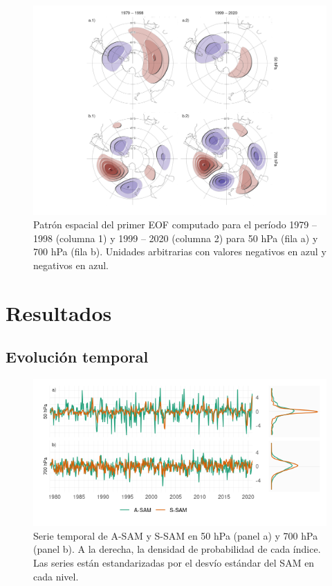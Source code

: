 \documentclass[12pt,oneside]{reedthesis}
\begin{document}
\begin{figure}
\includegraphics{figures/30-sam/sam-period-1} \caption{Patrón espacial del primer EOF computado para el período 1979 -- 1998 (columna 1) y 1999 -- 2020 (columna 2) para 50 hPa (fila a) y 700 hPa (fila b). Unidades arbitrarias con valores negativos en azul y negativos en azul.}\label{fig:sam-period}
\end{figure}

\hypertarget{resultados-2}{%
\section{Resultados}\label{resultados-2}}

\hypertarget{temporal}{%
\subsection{Evolución temporal}\label{temporal}}



\begin{figure}
\includegraphics{figures/30-sam/asymsam-timeseries-1} \caption{Serie temporal de A-SAM y S-SAM en 50 hPa (panel a) y 700 hPa (panel b). A la derecha, la densidad de probabilidad de cada índice. Las series están estandarizadas por el desvío estándar del SAM en cada nivel.}\label{fig:asymsam-timeseries}
\end{figure}
\end{document}
